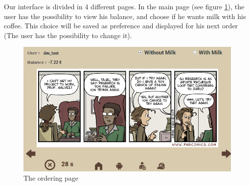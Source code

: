 \documentclass[12pt]{article}
\begin{document}
   Our interface is divided in 4 different pages. In the main page (see figure \ref{fig:orderPage}), the user has the possibility to view his balance, and
   choose if he wants milk with his coffee. This choice will be saved as preference and displayed for his next order (The user has the possibility to change it). \\
   \begin{figure}[h]
   \centering
   \includegraphics[width=1.0\textwidth]{./images/order_page}
   \captionsetup{justification=centering}
   \caption{The ordering page}
   \label{fig:orderPage}
  \end{figure}
  
\end{document}
